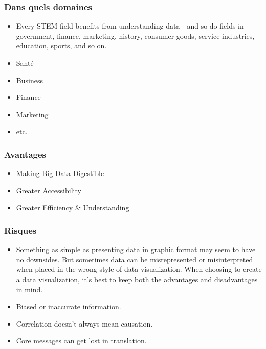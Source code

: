\begin{frame}\frametitle{Dans quels domaines}
   \begin{itemize}
      \item Every STEM field benefits from understanding data—and so do fields in government, finance, marketing, history, consumer goods, service industries, education, sports, and so on. 
      \item Santé
      \item Business
      \item Finance
      \item Marketing
      \item etc.
   \end{itemize}
\end{frame}

\begin{frame}\frametitle{Avantages}
   \begin{itemize}
      \item Making Big Data Digestible
      \item Greater Accessibility
      \item Greater Efficiency & Understanding
   \end{itemize}
\end{frame}

\begin{frame}\frametitle{Risques}
   \begin{itemize}
      \item Something as simple as presenting data in graphic format may seem to have no downsides. But sometimes data can be misrepresented or misinterpreted when placed in the wrong style of data visualization. When choosing to create a data visualization, it’s best to keep both the advantages and disadvantages in mind. 
      \item Biased or inaccurate information.
      \item Correlation doesn't always mean causation.
      \item Core messages can get lost in translation.
   \end{itemize}
\end{frame}




